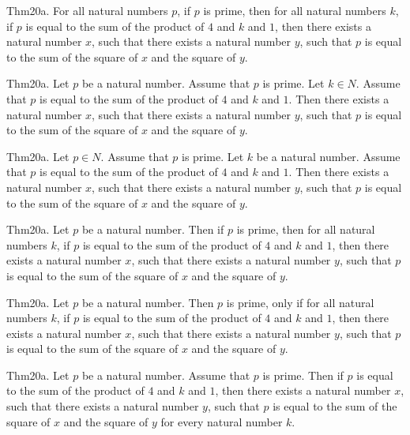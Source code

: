 \documentclass{article}
\begin{document}
Thm20a. For all natural numbers $p$, if $p$ is prime, then for all natural numbers $k$, if $p$ is equal to the sum of the product of $4$ and $k$ and $1$, then there exists a natural number $x$, such that there exists a natural number $y$, such that $p$ is equal to the sum of the square of $x$ and the square of $y$.

Thm20a. Let $p$ be a natural number. Assume that $p$ is prime. Let $k \in N$. Assume that $p$ is equal to the sum of the product of $4$ and $k$ and $1$. Then there exists a natural number $x$, such that there exists a natural number $y$, such that $p$ is equal to the sum of the square of $x$ and the square of $y$.

Thm20a. Let $p \in N$. Assume that $p$ is prime. Let $k$ be a natural number. Assume that $p$ is equal to the sum of the product of $4$ and $k$ and $1$. Then there exists a natural number $x$, such that there exists a natural number $y$, such that $p$ is equal to the sum of the square of $x$ and the square of $y$.

Thm20a. Let $p$ be a natural number. Then if $p$ is prime, then for all natural numbers $k$, if $p$ is equal to the sum of the product of $4$ and $k$ and $1$, then there exists a natural number $x$, such that there exists a natural number $y$, such that $p$ is equal to the sum of the square of $x$ and the square of $y$.

Thm20a. Let $p$ be a natural number. Then $p$ is prime, only if for all natural numbers $k$, if $p$ is equal to the sum of the product of $4$ and $k$ and $1$, then there exists a natural number $x$, such that there exists a natural number $y$, such that $p$ is equal to the sum of the square of $x$ and the square of $y$.

Thm20a. Let $p$ be a natural number. Assume that $p$ is prime. Then if $p$ is equal to the sum of the product of $4$ and $k$ and $1$, then there exists a natural number $x$, such that there exists a natural number $y$, such that $p$ is equal to the sum of the square of $x$ and the square of $y$ for every natural number $k$.
\end{document}

